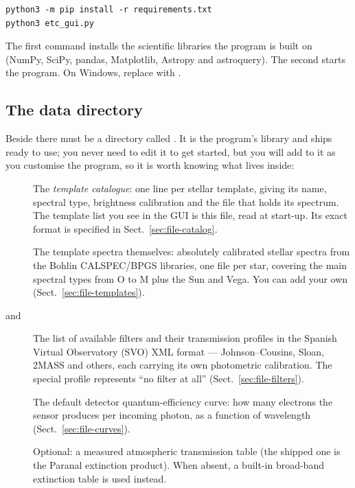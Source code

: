 \begin{verbatim}
python3 -m pip install -r requirements.txt
python3 etc_gui.py
\end{verbatim}

The first command installs the scientific libraries the program is built
on (NumPy, SciPy, pandas, Matplotlib, Astropy and astroquery). The second
starts the program. On Windows, replace  with .

\subsection{The data directory}

Beside  there must be a directory called .
It is the program's library and ships ready to use; you never need to edit
it to get started, but you will add to it as you customise the program, so
it is worth knowing what lives inside:

\begin{description}
\item[] The \emph{template catalogue}: one line per
  stellar template, giving its name, spectral type, brightness
  calibration and the file that holds its spectrum. The template list you
  see in the GUI is this file, read at start-up. Its exact format is
  specified in Sect.~\ref{sec:file-catalog}.
\item[] The template spectra themselves: absolutely calibrated
  stellar spectra from the Bohlin CALSPEC/BPGS libraries, one file per
  star, covering the main spectral types from O to M plus the Sun and
  Vega. You can add your own (Sect.~\ref{sec:file-templates}).
\item[ and ] The list of available
  filters and their transmission profiles in the Spanish Virtual
  Observatory (SVO) XML format --- Johnson--Cousins, Sloan, 2MASS and
  others, each carrying its own photometric calibration. The special
   profile represents ``no filter at all''
  (Sect.~\ref{sec:file-filters}).
\item[] The default detector quantum-efficiency curve: how
  many electrons the sensor produces per incoming photon, as a function of
  wavelength (Sect.~\ref{sec:file-curves}).
\item[] Optional: a measured
  atmospheric transmission table (the shipped one is the Paranal
  extinction product). When absent, a built-in broad-band extinction
  table is used instead.
\end{description}

